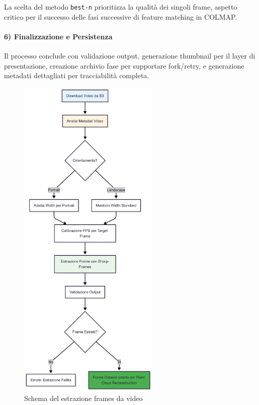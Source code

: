 La scelta del metodo \texttt{best-n} prioritizza la qualità dei singoli frame, aspetto critico per il successo delle fasi successive di feature matching in COLMAP.

\paragraph{6) Finalizzazione e Persistenza}
Il processo conclude con validazione output, generazione thumbnail per il layer di presentazione, creazione archivio fase per supportare fork/retry, e generazione metadati dettagliati per tracciabilità completa.

\begin{figure}[htbp]
	\centering
	\includegraphics[width=0.6\textwidth]{images/frame_extraction_diagram.jpg}
	\caption{Schema del estrazione frames da video}
	\label{fig:frame_extraction_diagram}
\end{figure}
\newpage
